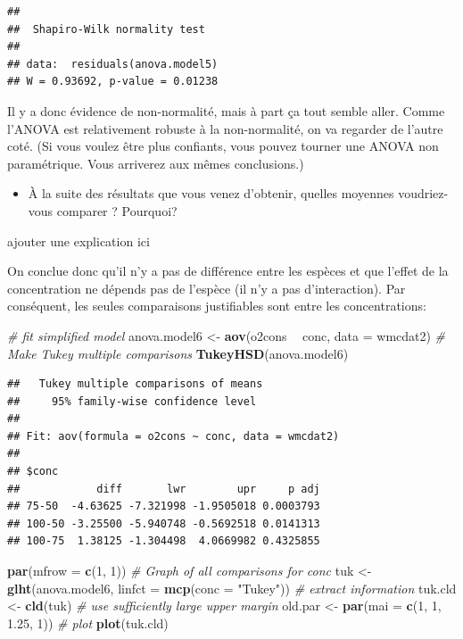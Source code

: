 \documentclass[12pt,]{book}
\newenvironment{Shaded}{\begin{snugshade}}{\end{snugshade}}
\newcommand{\CommentTok}[1]{\textcolor[rgb]{0.37,0.37,0.37}{\textit{#1}}}
\newcommand{\DataTypeTok}[1]{\textcolor[rgb]{0.27,0.27,0.27}{#1}}
\newcommand{\DecValTok}[1]{\textcolor[rgb]{0.06,0.06,0.06}{#1}}
\newcommand{\FloatTok}[1]{\textcolor[rgb]{0.06,0.06,0.06}{#1}}
\newcommand{\KeywordTok}[1]{\textcolor[rgb]{0.27,0.27,0.27}{\textbf{#1}}}
\newcommand{\NormalTok}[1]{#1}
\newcommand{\OperatorTok}[1]{\textcolor[rgb]{0.43,0.43,0.43}{\textbf{#1}}}
\newcommand{\StringTok}[1]{\textcolor[rgb]{0.5,0.5,0.5}{#1}}
\providecommand{\tightlist}{%
  \setlength{\itemsep}{0pt}\setlength{\parskip}{0pt}}
\begin{document}
\begin{verbatim}
## 
## 	Shapiro-Wilk normality test
## 
## data:  residuals(anova.model5)
## W = 0.93692, p-value = 0.01238
\end{verbatim}

Il y a donc évidence de non-normalité, mais à part ça tout semble aller. Comme l'ANOVA est relativement robuste à la non-normalité, on va regarder de l'autre coté. (Si vous voulez être plus confiants, vous pouvez tourner une ANOVA non paramétrique. Vous arriverez aux mêmes conclusions.)

\begin{itemize}
\tightlist
\item
  À la suite des résultats que vous venez d'obtenir, quelles moyennes voudriez-vous comparer ? Pourquoi?
\end{itemize}

ajouter une explication ici

On conclue donc qu'il n'y a pas de différence entre les espèces et que l'effet de la concentration ne dépends pas de l'espèce (il n'y a pas d'interaction). Par conséquent, les seules comparaisons justifiables sont entre les concentrations:

\begin{Shaded}
\begin{Highlighting}[]
\CommentTok{# fit simplified model}
\NormalTok{anova.model6 <-}\StringTok{ }\KeywordTok{aov}\NormalTok{(o2cons }\OperatorTok{~}\StringTok{ }\NormalTok{conc, }\DataTypeTok{data =}\NormalTok{ wmcdat2)}
\CommentTok{# Make Tukey multiple comparisons}
\KeywordTok{TukeyHSD}\NormalTok{(anova.model6)}
\end{Highlighting}
\end{Shaded}

\begin{verbatim}
##   Tukey multiple comparisons of means
##     95% family-wise confidence level
## 
## Fit: aov(formula = o2cons ~ conc, data = wmcdat2)
## 
## $conc
##            diff       lwr        upr     p adj
## 75-50  -4.63625 -7.321998 -1.9505018 0.0003793
## 100-50 -3.25500 -5.940748 -0.5692518 0.0141313
## 100-75  1.38125 -1.304498  4.0669982 0.4325855
\end{verbatim}

\begin{Shaded}
\begin{Highlighting}[]
\KeywordTok{par}\NormalTok{(}\DataTypeTok{mfrow =} \KeywordTok{c}\NormalTok{(}\DecValTok{1}\NormalTok{, }\DecValTok{1}\NormalTok{))}
\CommentTok{# Graph of all comparisons for conc}
\NormalTok{tuk <-}\StringTok{ }\KeywordTok{glht}\NormalTok{(anova.model6, }\DataTypeTok{linfct =} \KeywordTok{mcp}\NormalTok{(}\DataTypeTok{conc =} \StringTok{"Tukey"}\NormalTok{))}
\CommentTok{# extract information}
\NormalTok{tuk.cld <-}\StringTok{ }\KeywordTok{cld}\NormalTok{(tuk)}
\CommentTok{# use sufficiently large upper margin}
\NormalTok{old.par <-}\StringTok{ }\KeywordTok{par}\NormalTok{(}\DataTypeTok{mai =} \KeywordTok{c}\NormalTok{(}\DecValTok{1}\NormalTok{, }\DecValTok{1}\NormalTok{, }\FloatTok{1.25}\NormalTok{, }\DecValTok{1}\NormalTok{))}
\CommentTok{# plot}
\KeywordTok{plot}\NormalTok{(tuk.cld)}
\end{Highlighting}
\end{Shaded}
\end{document}
